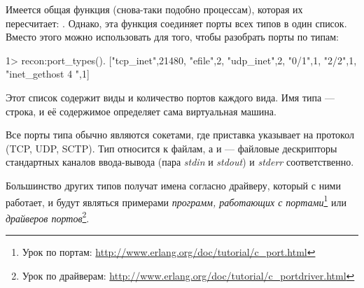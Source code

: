 \documentclass[11pt, oneside]{book}   	%
\begin{document}
Имеется общая функция (снова-таки подобно процессам), которая их пересчитает: . Однако, эта функция соединяет порты всех типов в один список. Вместо этого можно использовать  для того, чтобы разобрать порты по типам:

\begin{VerbatimEshell}
1> recon:port_types().
[{"tcp_inet",21480},
 {"efile",2},
 {"udp_inet",2},
 {"0/1",1},
 {"2/2",1},
 {"inet_gethost 4 ",1}]
 \end{VerbatimEshell}

Этот список содержит виды и количество портов каждого вида. Имя типа --- строка, и её содержимое определяет сама виртуальная машина.

Все порты типа  обычно являются сокетами, где приставка указывает на протокол (TCP, UDP, SCTP). Тип  относится к файлам, а  и  --- файловые дескрипторы стандартных каналов ввода-вывода (пара \emph{stdin} и \emph{stdout}) и \emph{stderr} соответственно.

Большинство других типов получат имена согласно драйверу, который с ними работает, и будут являться примерами \emph{программ, работающих с портами}\footnote{Урок по портам: \href{http://www.erlang.org/doc/tutorial/c\_port.html}{http://www.erlang.org/doc/tutorial/c\_port.html}} или \emph{драйверов портов}\footnote{Урок по драйверам: \href{http://www.erlang.org/doc/tutorial/c\_portdriver.html}{http://www.erlang.org/doc/tutorial/c\_portdriver.html}}.
\end{document}
